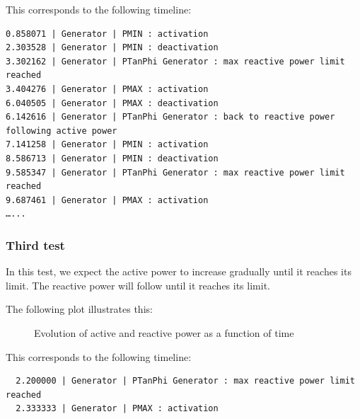 \documentclass[a4paper, 12pt]{report}
\begin{document}
This corresponds to the following timeline:
\begin{verbatim}
0.858071 | Generator | PMIN : activation
2.303528 | Generator | PMIN : deactivation
3.302162 | Generator | PTanPhi Generator : max reactive power limit reached
3.404276 | Generator | PMAX : activation
6.040505 | Generator | PMAX : deactivation
6.142616 | Generator | PTanPhi Generator : back to reactive power following active power
7.141258 | Generator | PMIN : activation
8.586713 | Generator | PMIN : deactivation
9.585347 | Generator | PTanPhi Generator : max reactive power limit reached
9.687461 | Generator | PMAX : activation
…...
\end{verbatim}

\subsubsection*{Third test}

In this test, we expect the active power to increase gradually until it reaches its limit.
The reactive power will follow until it reaches its limit.

The following plot illustrates this:
\begin{figure}[H]
  \caption{Evolution of active and reactive power as a function of time}
\end{figure}

This corresponds to the following timeline:
\begin{verbatim}
  2.200000 | Generator | PTanPhi Generator : max reactive power limit reached
  2.333333 | Generator | PMAX : activation
\end{verbatim}
\end{document}
